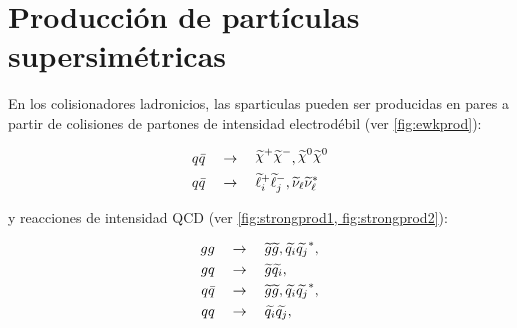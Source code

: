 






\section{Producción de partículas supersimétricas}

En los colisionadores ladronicios, las sparticulas pueden ser
producidas en pares a partir de colisiones de partones de intensidad
electrodébil (ver \cref{fig:ewkprod}):

\begin{align}
  &q\bar{q} \quad \to \quad \chinop \chinom, \nino
  \nino \label{eq:qq_ewk} \\ &q\bar{q} \quad \to \quad
  \susy{\ell}^{+}_{i}\susy{\ell}^{-}_{j},
  \susy{\nu}_{\ell}\susy{\nu}^{*}_{\ell} \label{qq_ewk2}\\
\end{align}

y reacciones de intensidad QCD (ver \cref{fig:strongprod1,
  fig:strongprod2}):

\begin{align}
  gg \quad &\rightarrow \quad \widetilde{g}\widetilde{g},
  \widetilde{q_i}\widetilde{q_j}^{*}, \label{eq:gg}\\ gq \quad &\rightarrow \quad
  \widetilde{g}\widetilde{q_i}, \label{eq:gq} \\ q\bar{q} \quad &\rightarrow \quad
  \widetilde{g}\widetilde{g}, \widetilde{q_i}\widetilde{q_j}^{*}, \label{eq:qqbar} \\ qq
  \quad &\rightarrow \quad \widetilde{q_i}\widetilde{q_j}, \label{eq:qq} \\
\end{align}

